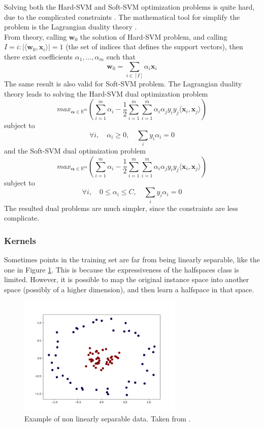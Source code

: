 Solving both the Hard-\ac{SVM} and Soft-\ac{SVM} optimization problems is quite hard, due to the complicated constraints \cite{Bottou06supportvector}. The mathematical tool for simplify the problem is the Lagrangian duality theory \cite{1886529043}.\\
From theory, calling $\mathbf{w}_0$ the solution of Hard-\ac{SVM} problem, and calling $I = {i : |\langle \mathbf{w}_0, \mathbf{x}_i \rangle| = 1}$ (the set of indices that defines the support vectors), then there exist coefficients $\alpha_1, \dots, \alpha_m$ such that
\[ \mathbf{w}_0 = \sum_{i \in [I]} \alpha _i \mathbf{x}_i \]
The same result is also valid for Soft-\ac{SVM} problem. The Lagrangian duality theory leads to solving the Hard-\ac{SVM} dual optimization problem
\[ max_{\mathbf{\alpha} \in \mathbb{R}^m} \left( \sum_{i=1}^{m} \alpha_i -\frac{1}{2} \sum_{i=1}^{m} \sum_{i=1}^{m} \alpha_i \alpha_j y_i y_j \langle \mathbf{x}_i, \mathbf{x}_j \rangle \right) \]
subject to
\[ \forall i, \quad \alpha_i \ge 0 , \quad \sum_i y_i \alpha_i = 0 \]
and the Soft-\ac{SVM} dual optimization problem
\[ max_{\mathbf{\alpha} \in \mathbb{R}^m} \left( \sum_{i=1}^{m} \alpha_i -\frac{1}{2} \sum_{i=1}^{m} \sum_{i=1}^{m} \alpha_i \alpha_j y_i y_j \langle \mathbf{x}_i, \mathbf{x}_j \rangle \right) \]
subject to
\[ \forall i, \quad 0 \le \alpha_i \le C , \quad \sum_i y_i \alpha_i = 0 \]
The resulted dual problems are much simpler, since the constraints are less complicate.\\

\subsubsection{Kernels}

Sometimes points in the training set are far from being linearly separable, like the one in Figure \ref{fig:kernel}. This is because the expressiveness of the halfspaces class is limited. However, it is possible to map the original instance space into another space (possibly of a higher dimension), and then learn a halfspace in that space.

\begin{figure}[ht]
	\centering
	\includegraphics[width=0.7\textwidth]{figures/kernel.png}
	\caption{Example of non linearly separable data. Taken from \cite{non-linearly-sep}.}
	\label{fig:kernel}
\end{figure}

